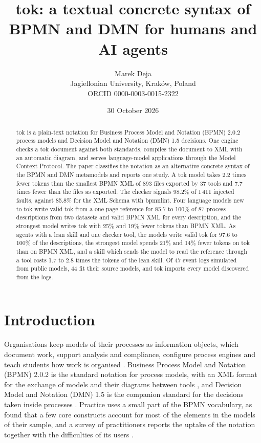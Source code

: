 \documentclass[11pt,a4paper]{article}
\title{tok: a textual concrete syntax of BPMN and DMN for humans and AI agents}
\author{Marek Deja\\[2pt]\small Jagiellonian University, Kraków, Poland\\\small ORCID 0000-0003-0015-2322}
\date{30 October 2026}
\begin{document}
\maketitle

\begin{abstract}
tok is a plain-text notation for Business Process Model and Notation (BPMN) 2.0.2 process models and Decision Model and Notation (DMN) 1.5 decisions. One engine checks a tok document against both standards, compiles the document to XML with an automatic diagram, and serves language-model applications through the Model Context Protocol. The paper classifies the notation as an alternative concrete syntax of the BPMN and DMN metamodels and reports one study. A tok model takes 2.2 times fewer tokens than the smallest BPMN XML of 893 files exported by 37 tools and 7.7 times fewer than the files as exported. The checker signals 98.2\% of 1\,411 injected faults, against 85.8\% for the XML Schema with bpmnlint. Four language models new to tok write valid tok from a one-page reference for 85.7 to 100\% of 87 process descriptions from two datasets and valid BPMN XML for every description, and the strongest model writes tok with 25\% and 19\% fewer tokens than BPMN XML. As agents with a lean skill and one checker tool, the models write valid tok for 97.6 to 100\% of the descriptions, the strongest model spends 21\% and 14\% fewer tokens on tok than on BPMN XML, and a skill which sends the model to read the reference through a tool costs 1.7 to 2.8 times the tokens of the lean skill. Of 47 event logs simulated from public models, 44 fit their source models, and tok imports every model discovered from the logs.
\end{abstract}

\section{Introduction}\label{sec:intro}

Organisations keep models of their processes as information objects, which document work, support analysis and compliance, configure process engines and teach students how work is organised \citep{Dumas2018fundamentals}. Business Process Model and Notation (BPMN) 2.0.2 is the standard notation for process models, with an XML format for the exchange of models and their diagrams between tools \citep{OMG2014BPMN}, and Decision Model and Notation (DMN) 1.5 is the companion standard for the decisions taken inside processes \citep{OMG2024DMN}. Practice uses a small part of the BPMN vocabulary, as \citet{zurMuehlen2008} found that a few core constructs account for most of the elements in the models of their sample, and a survey of practitioners reports the uptake of the notation together with the difficulties of its users \citep{Recker2010opportunities}.
\end{document}
